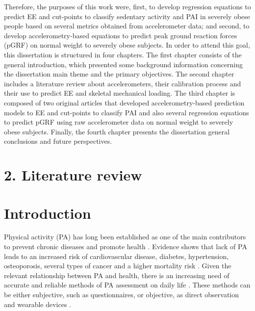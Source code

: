 \documentclass[12pt]{article}
\def\blankpage{%
      \clearpage%
      \thispagestyle{empty}%
      \addtocounter{page}{+0}%
      \null%
      \clearpage}
\begin{document}
Therefore, the purposes of this work were, first, to develop regression equations to predict EE and cut-points to classify sedentary activity and PAI in severely obese people based on several metrics obtained from accelerometer data; and second, to develop accelerometry-based equations to predict peak ground reaction forces (pGRF) on normal weight to severely obese subjects. In order to attend this goal, this dissertation is structured in four chapters. The first chapter consists of the general introduction, which presented some background information concerning the dissertation main theme and the primary objectives. The second chapter includes a literature review about accelerometers, their calibration process and their use to predict EE and skeletal mechanical loading. The third chapter is composed of two original articles that developed accelerometry-based prediction models to EE and cut-points to classify PAI and also several regression equations to predict pGRF using raw accelerometer data on normal weight to severely obese subjects. Finally, the fourth chapter presents the dissertation general conclusions and future perspectives.

\pagebreak

\renewcommand{\refnameintro}{\large References}
\vspace{0.5em}
\pagebreak


\section*{\vfill\raggedleft\bfseries 2. Literature review}
\thispagestyle{empty} 
\blankpage

\section*{Introduction}

Physical activity (PA) has long been established as one of the main contributors to prevent chronic diseases and promote health . Evidence shows that lack of PA leads to an increased risk of cardiovascular disease, diabetes, hypertension, osteoporosis, several types of cancer and a higher mortality risk . Given the relevant relationship between PA and health, there is an increasing need of accurate and reliable methods of PA assessment on daily life . These methods can be either subjective, such as questionnaires, or objective, as direct observation and wearable devices .
\end{document}
